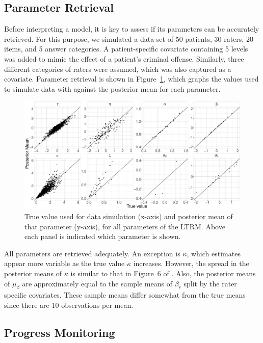 \documentclass{article}
\newcommand{\Irater}{r}
\begin{document}
\subsection*{Parameter Retrieval}
Before interpreting a model, it is key to assess if its parameters can be accurately retrieved. For this purpose, we simulated a data set of 50 patients, 30 raters, 20 items, and 5 answer categories. A patient-specific covariate containing 5 levels was added to mimic the effect of a patient's criminal offense. Similarly, three different categories of raters were assumed, which was also captured as a covariate. Parameter retrieval is shown in Figure~\ref{fig:parameterRecoveryM3}, which graphs the values used to simulate data with against the posterior mean for each parameter. 

\begin{figure}[!ht]
	\centering
	\includegraphics[width= \textwidth]{figures/parameterRecoveryModel3.pdf}
	\caption{True value used for data simulation (x-axis) and posterior mean of that parameter (y-axis), for all parameters of the LTRM. Above each panel is indicated which parameter is shown.}
	\label{fig:parameterRecoveryM3}
\end{figure}

All parameters are retrieved adequately. An exception is $\kappa$, which estimates appear more variable as the true value $\kappa$ increases. However, the spread in the posterior means of $\kappa$ is similar to that in Figure~6 of . Also, the posterior means of $\mu_\beta$ are approximately equal to the sample means of $\beta_\Irater$ split by the rater specific covariates. These sample means differ somewhat from the true means since there are 10 observations per mean.

\subsection*{Progress Monitoring}
\end{document}
